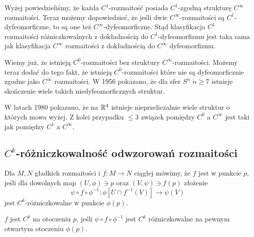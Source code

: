 Wyżej powiedzieliśmy, że każda $C^1$-rozmaitość posiada $C^1$-zgodną strukturę $C^\infty$ rozmaitości. Teraz możemy dopowiedzieć, że jeśli dwie $C^\infty$-rozmaitości są $C^1$-dyfeomorficzne, to są one też $C^\infty$-dyfeomorficzne. Stąd klasyfikacja $C^1$ rozmaitości różniczkowalnych z dokładnością do $C^1$-dyfeomorfizmu jest taka sama jak klasyfikacja $C^\infty$ rozmaitości z dokładnością do $C^\infty$ dyfeomorfizmu.

Wiemy już, że istnieją $C^0$-rozmaitości bez struktury $C^\infty$-rozmaitości. Możemy teraz dodać do tego fakt, że istnieją $C^0$-rozmaitości które nie są dyfeomorficznie zgodne jako $C^\infty$ rozmaitości. W 1956 pokazano, że dla sfer $S^n$ $n\geq 7$ istnieje skończenie wiele takich niedyfeomorficznych struktur. 

W latach 1980 pokazano, że na $\mathbb{R}^4$ istnieje nieprzeliczalnie wiele struktur o których mowa wyżej. Z kolei przypadku $\leq 3$ związek pomiędzy $C^0$ a $C^\infty$ jest taki jak pomiędzy $C^1$ a $C^\infty$.

\subsection{$C^k$-różniczkowalność odwzorowań rozmaitości}

\begin{definition}\label{definicja:1.12}
Dla $M, N$ gładkich rozmaitości i $f:M\to N$ ciągłej mówimy, że $f$ jest  w punkcie $p$, jeśli dla dowolnych map $(U,\phi)\ni p$ oraz $(V,\psi)\ni f(p)$ złożenie
$$\psi\circ f\circ\phi^{-1}:\phi[U\cap f^{-1}(V)]\to \psi(V)$$
jest $C^k$-różniczkowalne w punkcie $\phi(p)$.

$f$ jest $C^k$ na otoczeniu $p$, jeśli $\psi\circ f\circ\phi^{-1}$ jest $C^k$ różniczkowalne na pewnym otwartym otoczeniu $\phi(p)$.
\end{definition}

